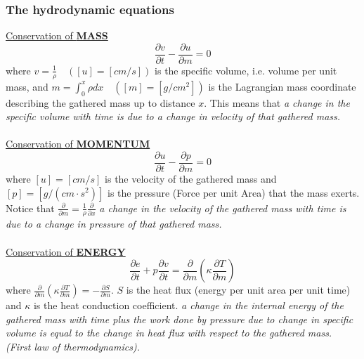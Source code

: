 \documentclass{article}
\begin{document}
\subsubsection{The hydrodynamic equations}
\underline{Conservation of \textbf{MASS}}
\begin{equation}
    \frac{\partial v}{\partial t} - \frac{\partial u}{\partial m} = 0
\end{equation}
where $v = \frac{1}{\rho}\quad([u] = [cm/s])$ is the specific volume, i.e. volume per unit mass, 
and $m = \int_0^x \rho dx\quad([m] = [g/cm^2])$ is the Lagrangian mass coordinate describing the gathered mass up to distance $x$.
This means that \textit{a change in the specific volume with time is due to a change in velocity of that gathered mass.}
\\ \\
\underline{Conservation of \textbf{MOMENTUM}}
\begin{equation}
    \frac{\partial u}{\partial t} - \frac{\partial p}{\partial m} = 0
\end{equation}
where $[u] = [cm/s]$ is the velocity of the gathered mass and $[p] = [g/(cm \cdot s^2)]$ is the pressure (Force per unit Area)
that the mass exerts. Notice that $\frac{\partial}{\partial m} = \frac{1}{\rho} \frac{\partial}{\partial x}$
\textit{a change in the velocity of the gathered mass with time is due to a change in pressure of that gathered mass.}
\\ \\ 
\underline{Conservation of \textbf{ENERGY}}
\begin{equation}
    \frac{\partial e}{\partial t} + p \frac{\partial v}{\partial t} = \frac{\partial}{\partial m} \left( \kappa \frac{\partial T}{\partial m} \right)
\end{equation}
where $\frac{\partial}{\partial m} \left( \kappa \frac{\partial T}{\partial m} \right) = -\frac{\partial S}{\partial m}$.
$S$ is the heat flux (energy per unit area per unit time) and $\kappa$ is the heat conduction coefficient. 
\textit{a change in the internal energy of the gathered mass with time plus the work done by pressure due to change in specific volume
is equal to the change in heat flux with respect to the gathered mass. (First law of thermodynamics).}
\end{document}
